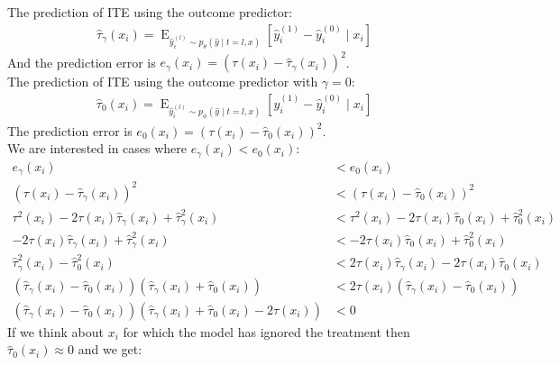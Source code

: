 \documentclass[oneside,12pt]{article}
\begin{document}
The prediction of ITE using the outcome predictor:
\begin{equation}
    \begin{split}
        \hat{\tau}_\gamma(x_i) = \operatorname{E}_{\hat{y}_i^{(l)} \sim p_\theta(\hat{y} \mid t=l,x)}\left[\hat{y}_i^{(1)}-\hat{y}_i^{(0)} \mid x_i \right]
    \end{split}
\end{equation}
And the prediction error is $e_\gamma(x_i)=\left(\tau(x_i)-\hat{\tau}_\gamma(x_i)\right)^2$.\\
The prediction of ITE using the outcome predictor with $\gamma=0$:
\begin{equation}
    \begin{split}
        \hat{\tau}_0(x_i) = \operatorname{E}_{\hat{y}_i^{(l)} \sim p_\phi(\hat{y} \mid t=l,x)}\left[\hat{y}_i^{(1)}-\hat{y}_i^{(0)} \mid x_i \right]
    \end{split}
\end{equation}
The prediction error is $e_0(x_i)=\left(\tau(x_i)-\hat{\tau}_0(x_i)\right)^2$.\\
We are interested in cases where $e_\gamma(x_i) < e_0(x_i)$:
\begin{equation}
    \begin{split}
        e_\gamma(x_i) &< e_0(x_i)\\
        \left(\tau(x_i)-\hat{\tau}_\gamma(x_i)\right)^2 &< \left(\tau(x_i)-\hat{\tau}_0(x_i)\right)^2\\
        \tau^2(x_i) - 2\tau(x_i)\hat{\tau}_\gamma(x_i) + \hat{\tau}^2_\gamma(x_i) &< \tau^2(x_i) - 2\tau(x_i)\hat{\tau}_0(x_i) + \hat{\tau}^2_0(x_i)\\
        - 2\tau(x_i)\hat{\tau}_\gamma(x_i) + \hat{\tau}^2_\gamma(x_i) &< - 2\tau(x_i)\hat{\tau}_0(x_i) + \hat{\tau}^2_0(x_i)\\
        \hat{\tau}^2_\gamma(x_i) - \hat{\tau}^2_0(x_i) &< 2\tau(x_i)\hat{\tau}_\gamma(x_i) - 2\tau(x_i)\hat{\tau}_0(x_i)\\
        (\hat{\tau}_\gamma(x_i) - \hat{\tau}_0(x_i)) (\hat{\tau}_\gamma(x_i) + \hat{\tau}_0(x_i)) &< 2\tau(x_i)(\hat{\tau}_\gamma(x_i) - \hat{\tau}_0(x_i))\\
        (\hat{\tau}_\gamma(x_i) - \hat{\tau}_0(x_i)) \left( \hat{\tau}_\gamma(x_i) + \hat{\tau}_0(x_i) - 2\tau(x_i) \right) &< 0
    \end{split}
\end{equation}
If we think about $x_i$ for which the model has ignored the treatment then $\hat{\tau}_0(x_i) \approx 0$ and we get:
\end{document}
